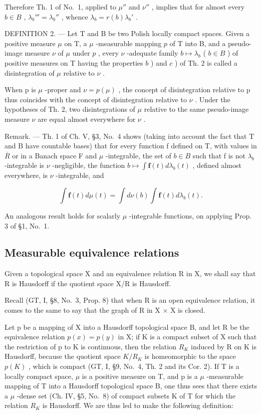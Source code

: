Therefore Th. 1 of No.~1, applied to \(\mu''\) and \(\nu''\) , implies that for almost every \(b \in B\) , \(\lambda_b''' = \lambda_b''\) , whence \(\lambda_b = r(b)\lambda_b'\) .

DEFINITION 2. --- Let T and B be two Polish locally compact spaces. Given a positive measure \(\mu\) on T, a \(\mu\) -measurable mapping \(p\) of T into B, and a pseudo-image measure \(\nu\) of \(\mu\) under \(p\) , every \(\nu\) -adequate family \(b \mapsto \lambda_b\) ( \(b \in B\) ) of positive measures on T having the properties \(b\) ) and \(c\) ) of Th. 2 is called a disintegration of \(\mu\) relative to \(\nu\) .

When p is \(\mu\) -proper and \(\nu = p(\mu)\) , the concept of disintegration relative to p thus coincides with the concept of disintegration relative to \(\nu\) . Under the hypotheses of Th. 2, two disintegrations of \(\mu\) relative to the same pseudo-image measure \(\nu\) are equal almost everywhere for \(\nu\) .

Remark. --- Th. 1 of Ch. V, §3, No.~4 shows (taking into account the fact that T and B have countable bases) that for every function f defined on T, with values in \(\overline{R}\) or in a Banach space F and \(\mu\) -integrable, the set of \(b \in B\) such that f is not \(\lambda_{b}\) -integrable is \(\nu\) -negligible, the function \(b \mapsto \int \mathbf{f}(t) d\lambda_{b}(t)\) , defined almost everywhere, is \(\nu\) -integrable, and

\[
\int \mathbf {f} (t) d \mu (t) = \int d \nu (b) \int \mathbf {f} (t) d \lambda_ {b} (t).
\]

An analogous result holds for scalarly \(\mu\) -integrable functions, on applying Prop. 3 of §1, No.~1.

\subsection{Measurable equivalence relations}

Given a topological space X and an equivalence relation R in X, we shall say that R is Hausdorff if the quotient space X/R is Hausdorff.

Recall (GT, I, §8, No.~3, Prop. 8) that when R is an open equivalence relation, it comes to the same to say that the graph of R in X × X is closed.

Let p be a mapping of X into a Hausdorff topological space B, and let R be the equivalence relation \(p(x) = p(y)\) in X; if K is a compact subset of X such that the restriction of p to K is continuous, then the relation \(R_{K}\) induced by R on K is Hausdorff, because the quotient space \(K/R_{K}\) is homeomorphic to the space \(p(K)\) , which is compact (GT, I, §9, No.~4, Th. 2 and its Cor. 2). If T is a locally compact space, \(\mu\) is a positive measure on T, and p is a \(\mu\) -measurable mapping of T into a Hausdorff topological space B, one thus sees that there exists a \(\mu\) -dense set (Ch. IV, §5, No.~8) of compact subsets K of T for which the relation \(R_{K}\) is Hausdorff. We are thus led to make the following definition:

